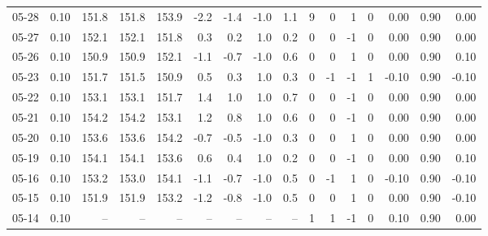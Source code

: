\begin{threeparttable}
{\begin{tabular}{lrrrrrrrrrrrrrrr}
  05-28 &     0.10 & 151.8 & 151.8 & 153.9 &       -2.2 &           -1.4 &                     -1.0 &                 1.1 &              9 &         0 &     1 &         0 &       0.00 &      0.90 &           0.00 \\
  05-27 &     0.10 & 152.1 & 152.1 & 151.8 &        0.3 &            0.2 &                      1.0 &                 0.2 &              0 &         0 &    -1 &         0 &       0.00 &      0.90 &           0.00 \\
  05-26 &     0.10 & 150.9 & 150.9 & 152.1 &       -1.1 &           -0.7 &                     -1.0 &                 0.6 &              0 &         0 &     1 &         0 &       0.00 &      0.90 &           0.10 \\
  05-23 &     0.10 & 151.7 & 151.5 & 150.9 &        0.5 &            0.3 &                      1.0 &                 0.3 &              0 &        -1 &    -1 &         1 &      -0.10 &      0.90 &          -0.10 \\
  05-22 &     0.10 & 153.1 & 153.1 & 151.7 &        1.4 &            1.0 &                      1.0 &                 0.7 &              0 &         0 &    -1 &         0 &       0.00 &      0.90 &           0.00 \\
  05-21 &     0.10 & 154.2 & 154.2 & 153.1 &        1.2 &            0.8 &                      1.0 &                 0.6 &              0 &         0 &    -1 &         0 &       0.00 &      0.90 &           0.00 \\
  05-20 &     0.10 & 153.6 & 153.6 & 154.2 &       -0.7 &           -0.5 &                     -1.0 &                 0.3 &              0 &         0 &     1 &         0 &       0.00 &      0.90 &           0.00 \\
  05-19 &     0.10 & 154.1 & 154.1 & 153.6 &        0.6 &            0.4 &                      1.0 &                 0.2 &              0 &         0 &    -1 &         0 &       0.00 &      0.90 &           0.10 \\
  05-16 &     0.10 & 153.2 & 153.0 & 154.1 &       -1.1 &           -0.7 &                     -1.0 &                 0.5 &              0 &        -1 &     1 &         0 &      -0.10 &      0.90 &          -0.10 \\
  05-15 &     0.10 & 151.9 & 151.9 & 153.2 &       -1.2 &           -0.8 &                     -1.0 &                 0.5 &              0 &         0 &     1 &         0 &       0.00 &      0.90 &          -0.10 \\
  05-14 &     0.10 &    -- &    -- &    -- &         -- &             -- &                       -- &                  -- &              1 &         1 &    -1 &         0 &       0.10 &      0.90 &           0.00 \\

\end{tabular}}
\end{threeparttable}
